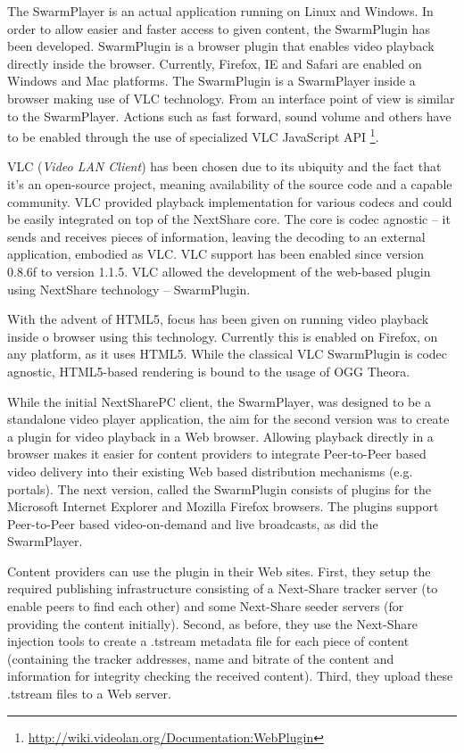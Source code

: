 The SwarmPlayer is an actual application running on Linux and Windows. In
order to allow easier and faster access to given content, the SwarmPlugin has
been developed. SwarmPlugin is a browser plugin that enables video playback
directly inside the browser. Currently, Firefox, IE and Safari are enabled on
Windows and Mac platforms. The SwarmPlugin is a SwarmPlayer inside a browser
making use of VLC technology. From an interface point of view is similar to
the SwarmPlayer. Actions such as fast forward, sound volume and others have to
be enabled through the use of specialized VLC JavaScript API
\footnote{\url{http://wiki.videolan.org/Documentation:WebPlugin}}.

VLC (\textit{Video LAN Client}) has been chosen due to its ubiquity and the fact that it's an open-source
project, meaning availability of the source code and a capable community. VLC
provided playback implementation for various codecs and could be easily
integrated on top of the NextShare core. The core is codec agnostic -- it
sends and receives pieces of information, leaving the decoding to an external
application, embodied as VLC. VLC support has been enabled since version
0.8.6f to version 1.1.5. VLC allowed the development of the web-based
plugin using NextShare technology -- SwarmPlugin.

With the advent of HTML5, focus has been given on running video playback
inside o browser using this technology. Currently this is enabled on Firefox,
on any platform, as it uses HTML5. While the classical VLC SwarmPlugin is
codec agnostic, HTML5-based rendering is bound to the usage of OGG Theora.

While the initial NextSharePC client, the SwarmPlayer, was designed to be a
standalone video player application, the aim for the second version was to
create a plugin for video playback in a Web browser. Allowing playback
directly in a browser makes it easier for content providers to integrate
Peer-to-Peer based video delivery into their existing Web based distribution
mechanisms (e.g. portals). The next version, called the SwarmPlugin consists of
plugins for the Microsoft Internet Explorer and Mozilla Firefox browsers. The
plugins support Peer-to-Peer based video-on-demand and live broadcasts, as
did the SwarmPlayer.

Content providers can use the plugin in their Web sites. First, they setup the
required publishing infrastructure consisting of a Next-Share tracker server
(to enable peers to find each other) and some Next-Share seeder servers (for
providing the content initially). Second, as before, they use the Next-Share
injection tools to create a .tstream metadata file for each piece of content
(containing the tracker addresses, name and bitrate of the content and
information for integrity checking the received content). Third, they upload
these .tstream files to a Web server.

